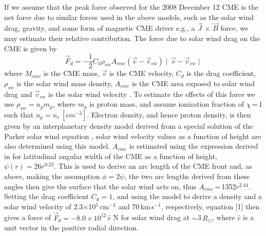 If we assume that the peak force observed for the 2008 December 12 CME is the net force due to similar forces used in the above models, such as the solar wind drag, gravity, and some form of magnetic CME driver e.g., a $\vec{J}\,\times\,\vec{B}$ force, we may estimate their relative contribution. The force due to solar wind drag on the CME is given by
\begin{equation}
\vec{F}_d=-\frac{1}{2}C_{d}\rho_{sw}A_{cme}(\vec{v}-\vec{v}_{sw})\mid\,\vec{v}-\vec{v}_{sw}\mid
\end{equation}
where $M_{cme}$ is the CME mass, $\vec{v}$ is the CME velocity, $C_{d}$ is the drag coefficient, $\rho_{sw}$ is the solar wind mass density, $A_{cme}$ is the CME area exposed to solar wind drag and $\vec{v}_{sw}$ is the solar wind velocity \citep{malo10}. To estimate the effects of this force we use $\rho_{sw}=n_{p}m_{p}$, where $m_{p}$ is proton mass, and assume ionization fraction of $\chi$\,=\,1 such that $n_{p}=n_{e}$\,$[cm^{-3}]$. Electron density, and hence proton density, is then given by an interplanetary density model derived from a special solution of the Parker solar wind equation \citep{Mann1999}, solar wind velocity values as a function of height are also determined using this model. $A_{cme}$ is estimated using the expression derived in \citet{byrne2010} for latitudinal angular width of the CME as a function of height, $\psi(r)=26r^{0.22}$. This is used to derive an arc length of the CME front and, as above, making the assumption $\phi=2\psi$, the two arc lengths derived from these angles then give the surface that the solar wind acts on, thus $A_{cme}$\,=\,1352$r^{2.44}$. Setting the drag coefficient $C_{d}=1$, and using the \citet{Mann1999} model to derive a density and a solar wind velocity of 2.3$\times$10$^{5}$\,cm$^{-3}$  and 70\,km\,s$^{-1}$, respectively, equation [1] then gives a force of $\vec{F}_{d}=-8.0\times10^{12}\,\hat{r}\,$\,N for solar wind drag at $\sim$3\,$R_{\odot}$, where $\hat{r}$ is a unit vector in the positive radial direction. 

